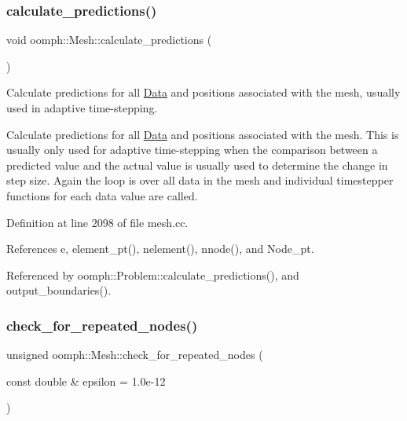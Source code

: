 \subsubsection{\texorpdfstring{calculate\+\_\+predictions()}{calculate\_predictions()}}
{\footnotesize\ttfamily void oomph\+::\+Mesh\+::calculate\+\_\+predictions (\begin{DoxyParamCaption}{ }\end{DoxyParamCaption})}



Calculate predictions for all \hyperlink{classoomph_1_1Data}{Data} and positions associated with the mesh, usually used in adaptive time-\/stepping. 

Calculate predictions for all \hyperlink{classoomph_1_1Data}{Data} and positions associated with the mesh. This is usually only used for adaptive time-\/stepping when the comparison between a predicted value and the actual value is usually used to determine the change in step size. Again the loop is over all data in the mesh and individual timestepper functions for each data value are called. 

Definition at line 2098 of file mesh.\+cc.



References e, element\+\_\+pt(), nelement(), nnode(), and Node\+\_\+pt.



Referenced by oomph\+::\+Problem\+::calculate\+\_\+predictions(), and output\+\_\+boundaries().

\mbox{\label{classoomph_1_1Mesh_aa8229e193565c8de821170d482dfcee2}} 
\subsubsection{\texorpdfstring{check\+\_\+for\+\_\+repeated\+\_\+nodes()}{check\_for\_repeated\_nodes()}}
{\footnotesize\ttfamily unsigned oomph\+::\+Mesh\+::check\+\_\+for\+\_\+repeated\+\_\+nodes (\begin{DoxyParamCaption}\item[{const double \&}]{epsilon = {\ttfamily 1.0e-\/12} }\end{DoxyParamCaption})\hspace{0.3cm}{\ttfamily [inline]}}




